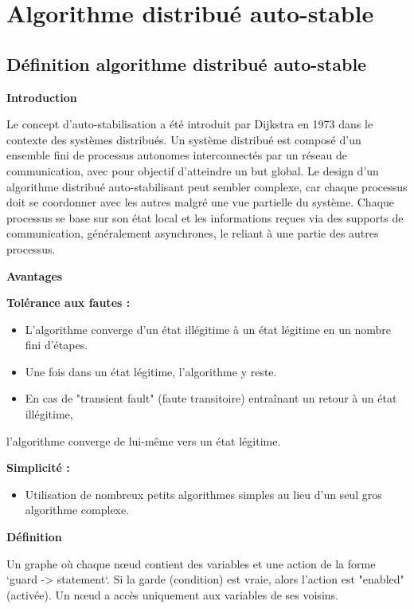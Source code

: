 \documentclass[11pt]{article}
\begin{document}
\section{Algorithme distribué auto-stable}
\label{sec:org6ae675c}


\subsection{Définition algorithme distribué auto-stable}
\label{sec:orgf11e7ce}


\textbf{\textbf{Introduction}}

Le concept d'auto-stabilisation a été introduit par Dijkstra en 1973 dans le contexte des systèmes distribués. 
Un système distribué est composé d'un ensemble fini de processus autonomes interconnectés par un réseau de communication, 
avec pour objectif d'atteindre un but global. Le design d'un algorithme distribué auto-stabilisant peut sembler complexe, 
car chaque processus doit se coordonner avec les autres malgré une vue partielle du système. 
Chaque processus se base sur son état local et les informations reçues via des supports de communication, généralement asynchrones, 
le reliant à une partie des autres processus.

\textbf{\textbf{Avantages}}

\textbf{\textbf{Tolérance aux fautes :}}
\begin{itemize}
\item L'algorithme converge d'un état illégitime à un état légitime en un nombre fini d'étapes.
\item Une fois dans un état légitime, l'algorithme y reste.
\item En cas de "transient fault" (faute transitoire) entraînant un retour à un état illégitime,
\end{itemize}
l'algorithme converge de lui-même vers un état légitime.

\textbf{\textbf{Simplicité :}}
\begin{itemize}
\item Utilisation de nombreux petits algorithmes simples au lieu d'un seul gros algorithme complexe.
\end{itemize}

\textbf{\textbf{Définition}}

Un graphe où chaque nœud contient des variables et une action de la forme `guard -> statement`. 
Si la garde (condition) est vraie, alors l'action est "enabled" (activée). Un nœud a accès uniquement aux variables de ses voisins.
\end{document}
